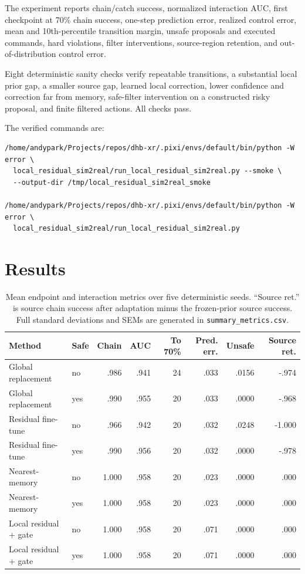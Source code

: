 \documentclass[11pt]{article}
\begin{document}
The experiment reports chain/catch success, normalized interaction AUC, first checkpoint at 70\% chain success, one-step prediction error, realized control error, mean and 10th-percentile transition margin, unsafe proposals and executed commands, hard violations, filter interventions, source-region retention, and out-of-distribution control error.

Eight deterministic sanity checks verify repeatable transitions, a substantial local prior gap, a smaller source gap, learned local correction, lower confidence and correction far from memory, safe-filter intervention on a constructed risky proposal, and finite filtered actions. All checks pass.

The verified commands are:
\begin{verbatim}
/home/andypark/Projects/repos/dhb-xr/.pixi/envs/default/bin/python -W error \
  local_residual_sim2real/run_local_residual_sim2real.py --smoke \
  --output-dir /tmp/local_residual_sim2real_smoke

/home/andypark/Projects/repos/dhb-xr/.pixi/envs/default/bin/python -W error \
  local_residual_sim2real/run_local_residual_sim2real.py
\end{verbatim}

\section{Results}

\begin{table}[H]
\centering
\small
\begin{tabular}{llrrrrrr}
\toprule
Method & Safe & Chain & AUC & To 70\% & Pred. err. & Unsafe & Source ret. \\
\midrule
Global replacement & no  & .986 & .941 & 24 & .033 & .0156 & -.974 \\
Global replacement & yes & .990 & .955 & 20 & .033 & .0000 & -.968 \\
Residual fine-tune & no  & .966 & .942 & 20 & .032 & .0248 & -1.000 \\
Residual fine-tune & yes & .990 & .956 & 20 & .032 & .0000 & -.978 \\
Nearest-memory & no  & 1.000 & .958 & 20 & .023 & .0000 & .000 \\
Nearest-memory & yes & 1.000 & .958 & 20 & .023 & .0000 & .000 \\
Local residual + gate & no  & 1.000 & .958 & 20 & .071 & .0000 & .000 \\
Local residual + gate & yes & 1.000 & .958 & 20 & .071 & .0000 & .000 \\
\bottomrule
\end{tabular}
\caption{Mean endpoint and interaction metrics over five deterministic seeds. ``Source ret.'' is source chain success after adaptation minus the frozen-prior source success. Full standard deviations and SEMs are generated in \texttt{summary\_metrics.csv}.}
\label{tab:main}
\end{table}
\end{document}
